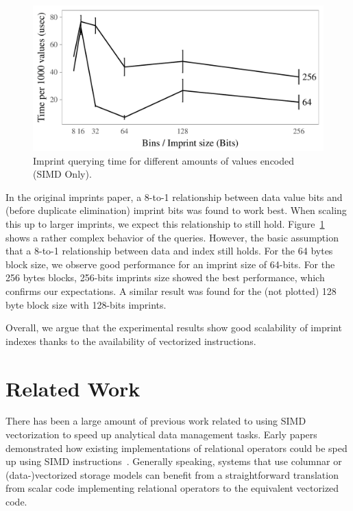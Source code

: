 \documentclass[sigconf]{acmart}
\begin{document}
\begin{figure}[t]
\begin{center}
\includegraphics[width=\columnwidth,trim=0mm 0mm 0mm 0mm,clip]{qblocksize2.pdf}
\end{center}
\caption{Imprint querying time for different amounts of values encoded (SIMD Only).\label{fig:qblocksize2}}
\end{figure}

In the original imprints paper, a 8-to-1 relationship between data value bits and (before duplicate elimination) imprint bits was found to work
best. When scaling this up to larger imprints, we expect this relationship to still hold. Figure~\ref{fig:qblocksize2} shows a rather complex
behavior of the queries. However, the basic assumption that a 8-to-1 relationship between data and index still holds. For the 64 bytes block size,
we observe good performance for an imprint size of 64-bits. For the 256 bytes blocks, 256-bits imprints size showed the best performance, which
confirms our expectations. A similar result was found for the (not plotted) 128 byte block size with 128-bits imprints.

Overall, we argue that the experimental results show good scalability of imprint indexes thanks to the availability of vectorized instructions.

\section{Related Work}

There has been a large amount of previous work related to using SIMD vectorization to speed up analytical data management tasks.
Early papers demonstrated how existing implementations of relational operators could be sped up using SIMD
instructions~\cite{DBLP:conf/sigmod/ZhouR02}. Generally speaking, systems that use columnar or (data-)vectorized storage models
can benefit from a straightforward translation from scalar code implementing relational operators to the equivalent vectorized
code. 
\end{document}
